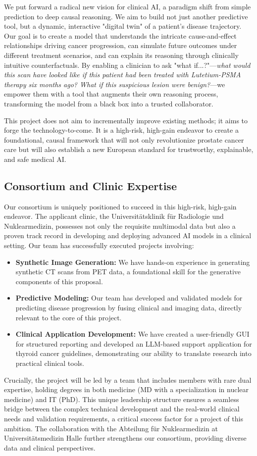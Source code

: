 \documentclass[11pt, a4paper]{article}
\begin{document}
We put forward a radical new vision for clinical AI, a paradigm shift from simple prediction to deep causal reasoning. We aim to build not just another predictive tool, but a dynamic, interactive "digital twin" of a patient's disease trajectory. Our goal is to create a model that understands the intricate cause-and-effect relationships driving cancer progression, can simulate future outcomes under different treatment scenarios, and can explain its reasoning through clinically intuitive counterfactuals. By enabling a clinician to ask "what if...?"—\textit{what would this scan have looked like if this patient had been treated with Lutetium-PSMA therapy six months ago? What if this suspicious lesion were benign?}—we empower them with a tool that augments their own reasoning process, transforming the model from a black box into a trusted collaborator.

This project does not aim to incrementally improve existing methods; it aims to forge the technology-to-come. It is a high-risk, high-gain endeavor to create a foundational, causal framework that will not only revolutionize prostate cancer care but will also establish a new European standard for trustworthy, explainable, and safe medical AI.

\subsection{Consortium and Clinic Expertise}
Our consortium is uniquely positioned to succeed in this high-risk, high-gain endeavor. The applicant clinic, the Universitätsklinik für Radiologie und Nuklearmedizin, possesses not only the requisite multimodal data but also a proven track record in developing and deploying advanced AI models in a clinical setting. Our team has successfully executed projects involving:
\begin{itemize}
    \item \textbf{Synthetic Image Generation:} We have hands-on experience in generating synthetic CT scans from PET data, a foundational skill for the generative components of this proposal.
    \item \textbf{Predictive Modeling:} Our team has developed and validated models for predicting disease progression by fusing clinical and imaging data, directly relevant to the core of this project.
    \item \textbf{Clinical Application Development:} We have created a user-friendly GUI for structured reporting and developed an LLM-based support application for thyroid cancer guidelines, demonstrating our ability to translate research into practical clinical tools.
\end{itemize}
Crucially, the project will be led by a team that includes members with rare dual expertise, holding degrees in both medicine (MD with a specialization in nuclear medicine) and IT (PhD). This unique leadership structure ensures a seamless bridge between the complex technical development and the real-world clinical needs and validation requirements, a critical success factor for a project of this ambition. The collaboration with the Abteilung für Nuklearmedizin at Universitätsmedizin Halle further strengthens our consortium, providing diverse data and clinical perspectives.
\end{document}
